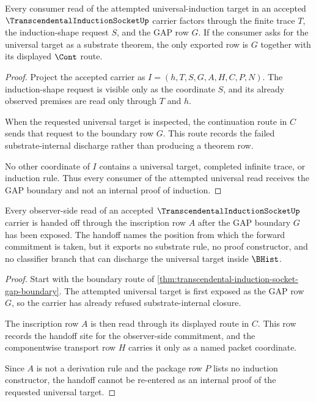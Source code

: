 \begin{theorem}
\label{thm:transcendental-induction-socket-gap-boundary}
Every consumer read of the attempted universal-induction target in an accepted $\TranscendentalInductionSocketUp$ carrier factors through the finite trace $T$, the induction-shape request $S$, and the GAP row $G$. If the consumer asks for the universal target as a substrate theorem, the only exported row is $G$ together with its displayed $\Cont$ route.
\end{theorem}
\begin{proof}
Project the accepted carrier as $I=(h,T,S,G,A,H,C,P,N)$. The induction-shape request is visible only as the coordinate $S$, and its already observed premises are read only through $T$ and $h$.

When the requested universal target is inspected, the continuation route in $C$ sends that request to the boundary row $G$. This route records the failed substrate-internal discharge rather than producing a theorem row.

No other coordinate of $I$ contains a universal target, completed infinite trace, or induction rule. Thus every consumer of the attempted universal read receives the GAP boundary and not an internal proof of induction.
\end{proof}

\begin{theorem}
\label{thm:transcendental-induction-socket-inscription-handoff}
Every observer-side read of an accepted $\TranscendentalInductionSocketUp$ carrier is handed off through the inscription row $A$ after the GAP boundary $G$ has been exposed. The handoff names the position from which the forward commitment is taken, but it exports no substrate rule, no proof constructor, and no classifier branch that can discharge the universal target inside $\BHist$.
\end{theorem}
\begin{proof}
Start with the boundary route of \autoref{thm:transcendental-induction-socket-gap-boundary}. The attempted universal target is first exposed as the GAP row $G$, so the carrier has already refused substrate-internal closure.

The inscription row $A$ is then read through its displayed route in $C$. This row records the handoff site for the observer-side commitment, and the componentwise transport row $H$ carries it only as a named packet coordinate.

Since $A$ is not a derivation rule and the package row $P$ lists no induction constructor, the handoff cannot be re-entered as an internal proof of the requested universal target.
\end{proof}

